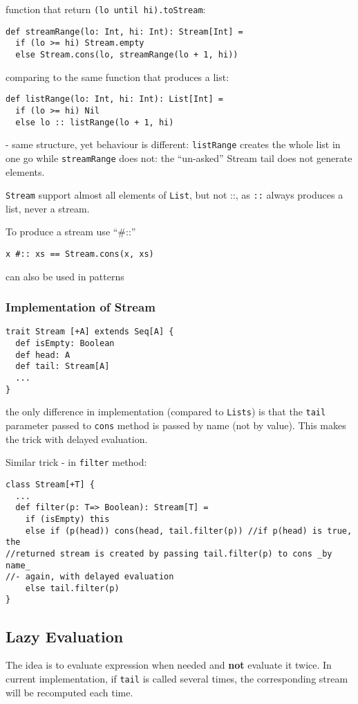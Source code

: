 \documentclass{scrartcl}
\begin{document}
function that return \lstinline|(lo until hi).toStream|:
\begin{lstlisting}
def streamRange(lo: Int, hi: Int): Stream[Int] =
  if (lo >= hi) Stream.empty
  else Stream.cons(lo, streamRange(lo + 1, hi))
\end{lstlisting}
comparing to the same function that produces a list:
\begin{lstlisting}
def listRange(lo: Int, hi: Int): List[Int] =
  if (lo >= hi) Nil
  else lo :: listRange(lo + 1, hi)
\end{lstlisting}
- same structure, yet behaviour is different: \lstinline|listRange| creates the
whole list in one go while \lstinline|streamRange| does not: the ``un-asked''
Stream tail does not generate elements.

\lstinline|Stream| support almost all elements of \lstinline|List|, but not ::,
as \lstinline|::| always produces a list, never a stream.

To produce a stream use ``\#::''
\begin{lstlisting}
x #:: xs == Stream.cons(x, xs)
\end{lstlisting}
can also be used in patterns

\subsubsection{Implementation of Stream}
\label{sec:ImplementationOfStream}
\begin{lstlisting}
trait Stream [+A] extends Seq[A] {
  def isEmpty: Boolean
  def head: A
  def tail: Stream[A]
  ...
}
\end{lstlisting}
the only difference in implementation (compared to \lstinline|Lists|) is that
the \lstinline|tail| parameter passed to \lstinline|cons| method is passed by
name (not by value). This makes the trick with delayed evaluation.

Similar trick - in \lstinline|filter|  method:
\begin{lstlisting}
class Stream[+T] {
  ...
  def filter(p: T=> Boolean): Stream[T] =
    if (isEmpty) this
    else if (p(head)) cons(head, tail.filter(p)) //if p(head) is true, the
//returned stream is created by passing tail.filter(p) to cons _by name_
//- again, with delayed evaluation
    else tail.filter(p)
}
\end{lstlisting}

\subsection{Lazy Evaluation}
\label{sec:LazyEvaluation}
The idea is to evaluate expression when needed and {\bf not} evaluate it twice. In current implementation, if \lstinline|tail| is called several times, the corresponding stream will be recomputed each time.
\end{document}
